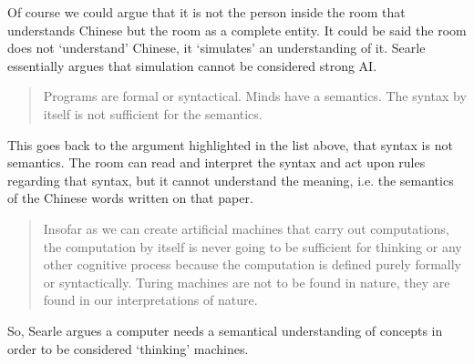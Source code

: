 Of course we could argue that it is not the person inside the room that understands Chinese but the room as a complete entity. It could be said the room does not `understand' Chinese, it `simulates' an understanding of it. Searle essentially argues that simulation cannot be considered strong \ac{AI}.

\begin{quotation}
  Programs are formal or syntactical. Minds have a semantics. The syntax by itself is not sufficient for the semantics. 
\end{quotation}

This goes back to the argument highlighted in the list above, that syntax is not semantics. The room can read and interpret the syntax and act upon rules regarding that syntax, but it cannot understand the meaning, i.e. the semantics of the Chinese words written on that paper.

\begin{quotation}
  Insofar as we can create artificial machines that carry out computations, the computation by itself is never going to be sufficient for thinking or any other cognitive process because the computation is defined purely formally or syntactically. Turing machines are not to be found in nature, they are found in our interpretations of nature. 
\end{quotation}

So, Searle argues a computer needs a semantical understanding of concepts in order to be considered `thinking' machines.




